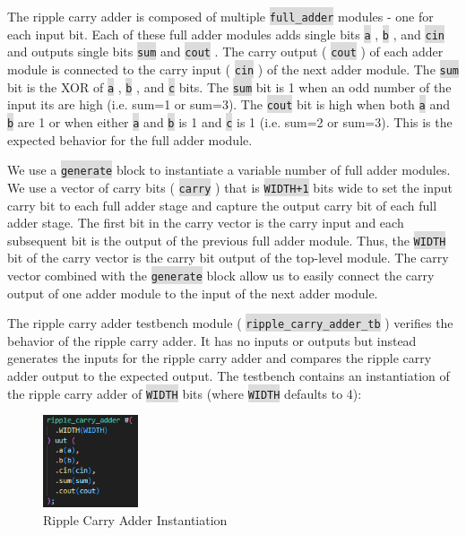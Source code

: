 \documentclass[fleqn]{article}
\newcommand{\code}[1]{%
	\colorbox{Gainsboro}{\texttt{#1}}%
}
\begin{document}
\begin{enumerate}
		The ripple carry adder is composed of multiple \code{full\_adder} modules - one for each input bit. Each of these full adder modules adds single bits \code{a}, \code{b}, and \code{cin} and outputs single bits \code{sum} and \code{cout}. The carry output (\code{cout}) of each adder module is connected to the carry input (\code{cin}) of the next adder module. The \code{sum} bit is the XOR of \code{a}, \code{b}, and \code{c} bits. The \code{sum} bit is 1 when an odd number of the input its are high (i.e. sum=1 or sum=3). The \code{cout} bit is high when both \code{a} and \code{b} are 1 or when either \code{a} and \code{b} is 1 and \code{c} is 1 (i.e. sum=2 or sum=3). This is the expected behavior for the full adder module.
		
		We use a \code{generate} block to instantiate a variable number of full adder modules. We use a vector of carry bits (\code{carry}) that is \code{WIDTH+1} bits wide to set the input carry bit to each full adder stage and capture the output carry bit of each full adder stage. The first bit in the carry vector is the carry input and each subsequent bit is the output of the previous full adder module. Thus, the \code{WIDTH} bit of the carry vector is the carry bit output of the top-level module. The carry vector combined with the \code{generate} block allow us to easily connect the carry output of one adder module to the input of the next adder module.
		 
		 The ripple carry adder testbench module (\code{ripple\_carry\_adder\_tb}) verifies the behavior of the ripple carry adder. It has no inputs or outputs but instead generates the inputs for the ripple carry adder and compares the ripple carry adder output to the expected output. The testbench contains an instantiation of the ripple carry adder of \code{WIDTH} bits (where \code{WIDTH} defaults to 4):
		 
		 \begin{figure}[H]
		 	\centerline{\includegraphics[width=0.25\textwidth]{ripple_carry_adder_inst.png}}
			\caption{Ripple Carry Adder Instantiation}
			\label{fig::ripple_carry_adder_inst}
		 \end{figure}
		 

\end{enumerate}
\end{document}
